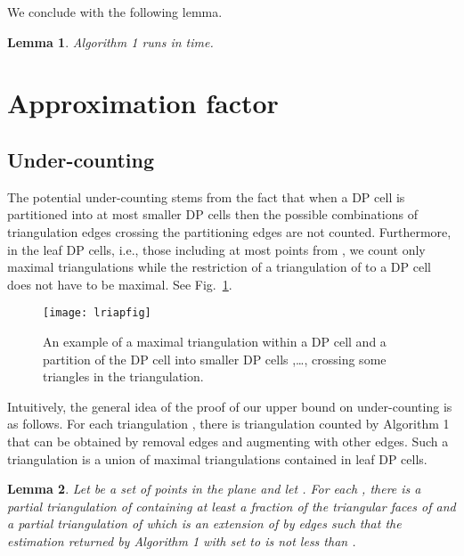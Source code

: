 \documentclass[a4paper]{article}
\newtheorem{lemma}{Lemma}
\begin{document}
We conclude with the following lemma.

\begin{lemma}\label{lem: time}
Algorithm 1 runs
in   time. 
\end{lemma}

\section{Approximation factor}

\subsection{Under-counting}

The potential under-counting
stems from the fact that when
a DP cell is partitioned
into at most  smaller DP cells
then the possible
combinations of triangulation
edges crossing the partitioning edges
are not counted. Furthermore,
in the leaf DP cells, i.e.,
those including at most 
points from , we count only
maximal triangulations while
the restriction of a triangulation
of  to a DP cell does not have
to be maximal.
See Fig.~\ref{fig. 2}.

\begin{figure}
\centering
\texttt{[image: lriapfig]}
\caption{An example of a maximal triangulation
within a DP cell and a partition of the DP cell into
smaller DP cells ,\dots, crossing some
triangles in the triangulation.}

\label{fig. 2}
\end{figure}

Intuitively, the general idea of the proof
of our upper bound on under-counting is
as follows. For each triangulation ,
there is triangulation counted by Algorithm 1
that can be obtained by removal 
edges and augmenting with 
other edges. Such a triangulation
is a union of maximal triangulations
contained in leaf DP cells.

\begin{lemma}\label{lem: under}
Let  be a set of  points in the plane
and let .
For each , there is a partial
triangulation  of 
containing at least a  
fraction of the triangular faces
of  and a partial triangulation
 of  which is an extension
of  by  edges
such that
the estimation returned by
Algorithm 1 with  set to
 is not less
than  .
\end{lemma}
\end{document}
